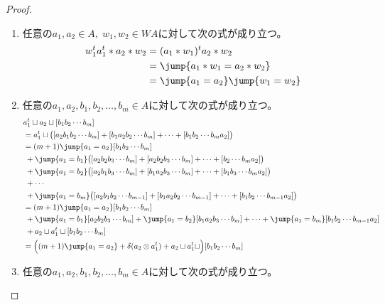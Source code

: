 		\begin{proof} %
			\begin{enumerate}\setlength{\itemsep}{-1mm} %
				\item 任意の$a_1,a_2\in A,\;w_1,w_2\in WA$に対して次の式が成り立つ。
				\begin{equation*}\begin{split} %
					w_1^t a_1^t* a_2* w_2 &= (a_1* w_1)^t a_2* w_2 \\
					&= \jump{a_1* w_1=a_2* w_2} \\
					&= \jump{a_1=a_2}\jump{w_1 = w_2} \\
				\end{split}\end{equation*} %
				\item 任意の$a_1,a_2,b_1,b_2,\dots,b_m\in A$に対して次の式が成り立つ。
				\begin{equation*}\begin{split} %
					& a_1^t\sqcup a_2\sqcup [b_1b_2\cdots b_m] \\
					&= a_1^t\sqcup \bigl([a_2b_1b_2\cdots b_m] 
						+ [b_1a_2b_2\cdots b_m] + \cdots + [b_1b_2\cdots b_ma_2]\bigr)\\
					&= (m+1)\jump{a_1=a_2}[b_1b_2\cdots b_m] \\
					&\;+ \jump{a_1=b_1}\bigl([a_2b_2b_3\cdots b_m] 
						+ [a_2b_2b_3\cdots b_m] + \cdots + [b_2\cdots b_ma_2]\bigr)\\
					&\;+ \jump{a_1=b_2}\bigl([a_2b_1b_3\cdots b_m] 
						+ [b_1a_2b_3\cdots b_m] + \cdots + [b_1b_3\cdots b_ma_2]\bigr)\\
					&\;+ \cdots \\
					&\;+ \jump{a_1=b_m}\bigl([a_2b_1b_2\cdots b_{m-1}] 
						+ [b_1a_2b_2\cdots b_{m-1}] + \cdots + [b_1b_2\cdots b_{m-1}a_2]\bigr)\\
					&= (m+1)\jump{a_1=a_2}[b_1b_2\cdots b_m] \\
					&\;+ \jump{a_1=b_1}[a_2b_2b_3\cdots b_m]
						+ \jump{a_1=b_2}[b_1a_2b_3\cdots b_m] + \cdots + \jump{a_1=b_m}[b_1b_2\cdots b_{m-1}a_2] \\
					&\;+ a_2\sqcup a_1^t\sqcup [b_1b_2\cdots b_m] \\
					&= \Bigl((m+1)\jump{a_1=a_2} +\delta(a_2\otimes a_1^t)	
						+ a_2\sqcup a_1^t\sqcup\Bigr) [b_1b_2\cdots b_m] \\
				\end{split}\end{equation*} %
				\item 任意の$a_1,a_2,b_1,b_2,\dots,b_m\in A$に対して次の式が成り立つ。

\end{enumerate}
\end{proof}
